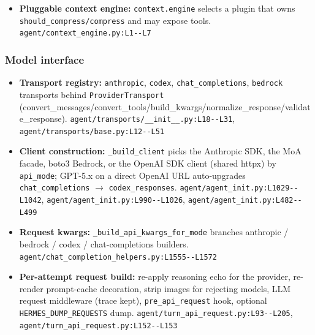 \begin{itemize}
\item \textbf{Pluggable context engine:} \texttt{context.\allowbreak{}engine} selects a plugin that owns \texttt{should\_\allowbreak{}compress/\allowbreak{}compress} and may expose tools. \texttt{agent/\allowbreak{}context\_\allowbreak{}engine.\allowbreak{}py:\allowbreak{}L1-\allowbreak{}-\allowbreak{}L7}
\end{itemize}

\subsubsection*{Model interface}
\begin{itemize}
\item \textbf{Transport registry:} \texttt{anthropic}, \texttt{codex}, \texttt{chat\_\allowbreak{}completions}, \texttt{bedrock} transports behind \texttt{ProviderTransport} (convert\_messages/convert\_tools/build\_kwargs/normalize\_response/validate\_response). \texttt{agent/\allowbreak{}transports/\allowbreak{}\_\allowbreak{}\_\allowbreak{}init\_\allowbreak{}\_\allowbreak{}.\allowbreak{}py:\allowbreak{}L18-\allowbreak{}-\allowbreak{}L31}, \texttt{agent/\allowbreak{}transports/\allowbreak{}base.\allowbreak{}py:\allowbreak{}L12-\allowbreak{}-\allowbreak{}L51}
\item \textbf{Client construction:} \texttt{\_\allowbreak{}build\_\allowbreak{}client} picks the Anthropic SDK, the MoA facade, boto3 Bedrock, or the OpenAI SDK client (shared httpx) by \texttt{api\_\allowbreak{}mode}; GPT-5.x on a direct OpenAI URL auto-upgrades \texttt{chat\_\allowbreak{}completions} $\rightarrow$ \texttt{codex\_\allowbreak{}responses}. \texttt{agent/\allowbreak{}agent\_\allowbreak{}init.\allowbreak{}py:\allowbreak{}L1029-\allowbreak{}-\allowbreak{}L1042}, \texttt{agent/\allowbreak{}agent\_\allowbreak{}init.\allowbreak{}py:\allowbreak{}L990-\allowbreak{}-\allowbreak{}L1026}, \texttt{agent/\allowbreak{}agent\_\allowbreak{}init.\allowbreak{}py:\allowbreak{}L482-\allowbreak{}-\allowbreak{}L499}
\item \textbf{Request kwargs:} \texttt{\_\allowbreak{}build\_\allowbreak{}api\_\allowbreak{}kwargs\_\allowbreak{}for\_\allowbreak{}mode} branches anthropic / bedrock / codex / chat-completions builders. \texttt{agent/\allowbreak{}chat\_\allowbreak{}completion\_\allowbreak{}helpers.\allowbreak{}py:\allowbreak{}L1555-\allowbreak{}-\allowbreak{}L1572}
\item \textbf{Per-attempt request build:} re-apply reasoning echo for the provider, re-render prompt-cache decoration, strip images for rejecting models, LLM request middleware (trace kept), \texttt{pre\_\allowbreak{}api\_\allowbreak{}request} hook, optional \texttt{HERMES\_\allowbreak{}DUMP\_\allowbreak{}REQUESTS} dump. \texttt{agent/\allowbreak{}turn\_\allowbreak{}api\_\allowbreak{}request.\allowbreak{}py:\allowbreak{}L93-\allowbreak{}-\allowbreak{}L205}, \texttt{agent/\allowbreak{}turn\_\allowbreak{}api\_\allowbreak{}request.\allowbreak{}py:\allowbreak{}L152-\allowbreak{}-\allowbreak{}L153}

\end{itemize}
